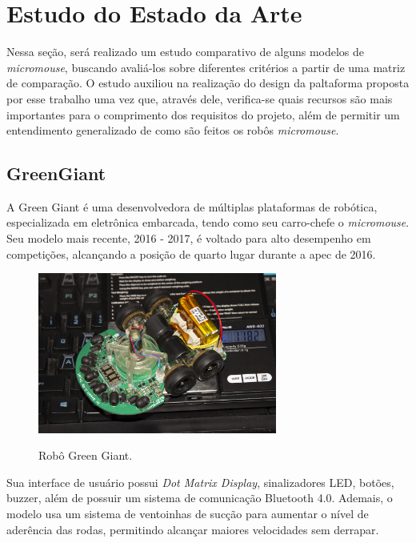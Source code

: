 \section{Estudo do Estado da Arte}
\label{sec:sota}
Nessa seção, será realizado um estudo comparativo de alguns modelos de \textit{micromouse}, buscando avaliá-los sobre diferentes critérios a partir de uma matriz de comparação. O estudo auxiliou na realização do design da paltaforma proposta por esse trabalho uma vez que, através dele, verifica-se quais recursos são mais importantes para o comprimento dos requisitos do projeto, além de permitir um entendimento generalizado de como são feitos os robôs \textit{micromouse}. 

\subsection{GreenGiant}
A Green Giant é uma desenvolvedora de múltiplas plataformas de robótica, especializada em eletrônica embarcada, tendo como seu carro-chefe o \textit{micromouse}. Seu modelo mais recente, 2016 - 2017, é voltado para alto desempenho em competições, alcançando a posição de quarto lugar durante a \gls*{apec} de 2016.

\begin{figure}[H]
	\centering
	\caption{Robô Green Giant.}
	\includegraphics[width=0.7\textwidth]
	{Figures/GreenGiant_model.jpg}
	\label{fig:Green_Giant_model}
	\end{figure}

Sua interface de usuário possui \textit{Dot Matrix Display}, sinalizadores LED, botões, buzzer, além de possuir um sistema de comunicação Bluetooth 4.0. Ademais, o modelo usa um sistema de ventoinhas de sucção para aumentar o nível de aderência das rodas, permitindo alcançar maiores velocidades sem derrapar.


